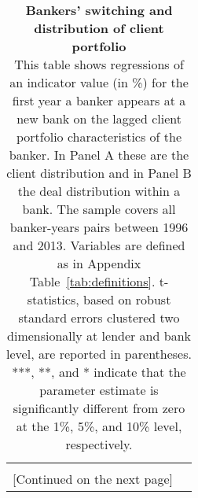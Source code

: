\begin{landscape}
\begin{longtable}[c]{p{} p{} }

\end{longtable} \end{landscape}


\begin{table}[H] \begin{center} 
	\caption{\textbf{Bankers' switching and distribution of client portfolio} \\ This table shows regressions of an indicator value (in \%) for the first year a banker appears at a new bank on the lagged client portfolio characteristics of the banker. In Panel A these are the client distribution and in Panel B the deal distribution within a bank. The sample covers all banker-years pairs between 1996 and 2013. Variables are defined as in Appendix Table~\ref{tab:definitions}. t-statistics, based on robust standard errors clustered two dimensionally at lender and bank level, are reported in parentheses. ***, **, and * indicate that the parameter estimate is significantly different from zero at the 1\%, 5\%, and 10\% level, respectively.} 
		\label{atab:banker_client_conc} 
	\begin{threeparttable} 	\begin{tabular*}{\hsize} {@{\hskip\tabcolsep\extracolsep\fill}l*{7}{c}} \\ \toprule 
 			  
		 		\bottomrule 
		 \\ \multicolumn{7}{c}{[Continued on the next page]} 
\end{tabular*} 	\end{threeparttable}  \end{center} \end{table}

